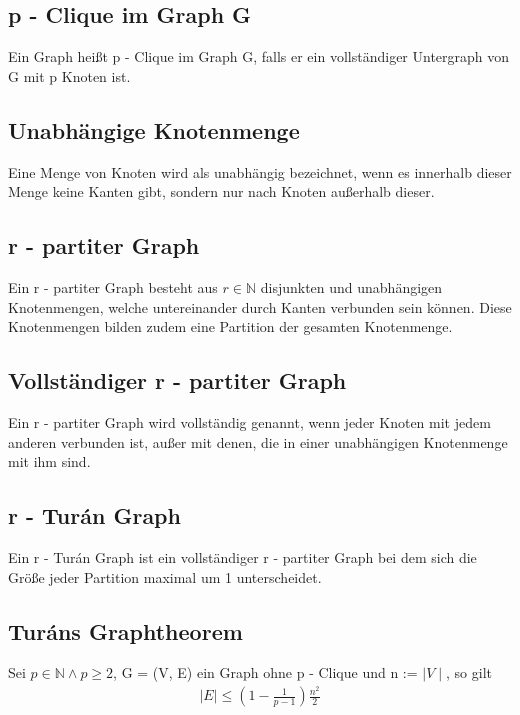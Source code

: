 \documentclass[12pt, a4paper]{article}
\begin{document}
\subsection{p - Clique im Graph G}
\label{theorem:p-clique-im-graph-g}
Ein Graph heißt p - Clique im Graph G, falls er ein vollständiger Untergraph von G mit p Knoten ist.


\subsection{Unabhängige Knotenmenge}
\label{theorem:unabhangige-knotenmenge}
Eine Menge von Knoten wird als unabhängig bezeichnet, wenn es innerhalb dieser Menge keine Kanten gibt, sondern nur nach Knoten außerhalb dieser.


\subsection{r - partiter Graph}
\label{theorem:r-partiter-graph}
Ein r - partiter Graph besteht aus $r \in \mathbb{N}$  disjunkten und unabhängigen Knotenmengen, welche untereinander durch Kanten verbunden sein können. Diese Knotenmengen bilden zudem eine Partition der gesamten Knotenmenge.


\subsection{Vollständiger r - partiter Graph}
\label{theorem:vollstandiger-r-partiter-graph}
Ein r - partiter Graph wird vollständig genannt, wenn jeder Knoten mit jedem anderen verbunden ist, außer mit denen, die in einer unabhängigen Knotenmenge mit ihm sind.


\subsection{r - Turán Graph}
\label{theorem:turan-graph}
Ein r - Turán Graph ist ein vollständiger r - partiter Graph bei dem sich die Größe jeder Partition maximal um 1 unterscheidet.


\subsection{Turáns Graphtheorem}
Sei $p \in \mathbb{N} \wedge p \ge 2$,  G = (V, E) ein Graph ohne p - Clique und n := $\mid V \mid$, so gilt
\begin{align} 
\mid E \mid \le (1- \frac{1}{p-1}) \frac{n^2}{2}
\end{align}
\end{document}
